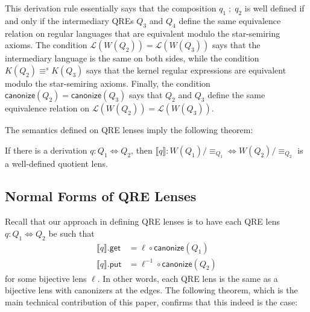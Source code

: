 \documentclass[acmsmall,review,anonymous]{acmart}
\newcommand{\codefont}[1]{\ensuremath{\mathsf{#1}}}
\newcommand{\kw}[1]{\codefont{#1}}
\newcommand{\eqrel}[1]{\ensuremath{\equiv_{#1}}}
\newcommand{\canonize}{\ensuremath{\kw{canonize}}}
\newcommand{\get}{\ensuremath{\kw{get}}}
\newcommand{\lput}{\ensuremath{\kw{put}}}
\begin{document}
This derivation rule essentially says that the composition $q_1 \; ; \; q_2$ is
well defined if and only if the intermediary QREs $Q_3$ and $Q_4$ define the
same equivalence relation on regular languages that are equivalent modulo the
star-semiring axioms. The condition $\mathcal{L}(W(Q_2)) = \mathcal{L}(W(Q_3))$
says that the intermediary language is the same on both sides, while the
condition $K(Q_2) \equiv^s K(Q_3)$ says that the kernel regular expressions are
equivalent modulo the star-semiring axioms. Finally, the condition
$\canonize(Q_2) = \canonize(Q_3)$ says that $Q_2$ and $Q_3$ define the same
equivalence relation on $\mathcal{L}(W(Q_2))= \mathcal{L}(W(Q_3))$.

The semantics defined on QRE lenses imply the following theorem:
\begin{theorem}
If there is a derivation $q : Q_1 \Leftrightarrow Q_2$, then $\llbracket q
\rrbracket : W(Q_1)/{\eqrel{Q_1}} \Leftrightarrow W(Q_2)/{\eqrel{Q_2}}$ is a
well-defined quotient lens.
\end{theorem}
\subsection{Normal Forms of QRE Lenses}
Recall that our approach in defining QRE lenses is to have each QRE lens $q: Q_1
\Leftrightarrow Q_2$ be such that
\begin{align*}
\llbracket q \rrbracket.\get &= \ell \circ \canonize(Q_1)\\
\llbracket q \rrbracket.\lput &= \ell^{-1} \circ \canonize(Q_2)
\end{align*}
for some bijective lens $\ell$. In other words, each QRE lens is the same as a
bijective lens with canonizers at the edges. The following theorem,
which is the main technical contribution of this paper, confirms that this
indeed is the case:
\end{document}
